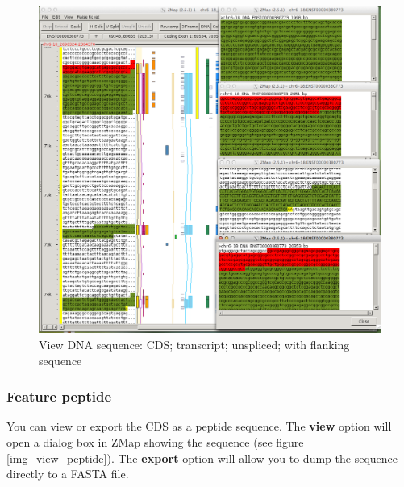 \documentclass[letterpaper]{article}
\begin{document}
\begin{figure}
\centering
\color[rgb]{0.30980393,0.5058824,0.7411765}
\includegraphics[width=15.231cm]{images/view_dna.png}
\caption{View DNA sequence: CDS; transcript; unspliced; with flanking sequence}
\label{img_view_dna}
\end{figure}

\subsubsection{Feature peptide} \label{sec_feature_peptide}
You can view or export the CDS as a peptide sequence. The \textbf{view} option will open a dialog box in ZMap showing the sequence (see figure \ref{img_view_peptide}). The \textbf{export} option will allow you to dump the sequence directly to a FASTA file.
\end{document}
